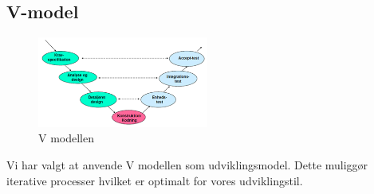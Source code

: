 \subsection{V-model}
\begin{figure}[H]
\centering
\includegraphics[width=0.5\textwidth]{billeder/vmodel}
\caption{V modellen}
\label{fig:vmodel}
\end{figure}
Vi har valgt at anvende V modellen som udviklingsmodel. Dette muliggør iterative processer hvilket er optimalt for vores udviklingstil.